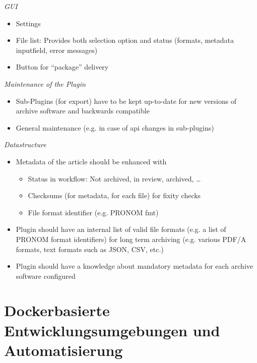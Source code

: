 \documentclass{article}
\begin{document}
{\itshape GUI}
\begin{itemize}
\item Settings
\item File list: Provides both selection option and status (formats, metadata inputfield, error messages)
\item Button for “package” delivery
\end{itemize} \par
{\itshape Maintenance of the Plugin}
\begin{itemize}
\item Sub-Plugins (for export) have to be kept up-to-date for new versions of archive software and backwards compatible
\item General maintenance (e.g. in case of api changes in sub-plugins)
\end{itemize} \par
{\itshape Datastructure}
\begin{itemize}
\item Metadata of the article should be enhanced with
\begin{itemize}
\item Status in workflow: Not archived, in review, archived, …
\item Checksums (for metadata, for each file) for fixity checks
\item File format identifier (e.g. PRONOM fmt)
\end{itemize} 
\item Plugin should have an internal list of valid file formats (e.g. a list of PRONOM format identifiers) for long term archiving (e.g. various PDF/A formats, text formats such as JSON, CSV, etc.)
\item Plugin should have a knowledge about mandatory metadata for each archive software configured
\end{itemize} 

 


\section{Docker\-basierte Entwicklungsumgebungen und Automatisierung}

\author{Daniel Nüst, Dennis Müller, Dulip Withanage}
\end{document}
